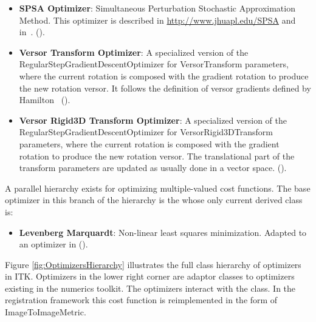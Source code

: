 \begin{itemize}
\item \textbf{SPSA Optimizer}: Simultaneous Perturbation Stochastic
Approximation Method. This optimizer is described in
\url{http://www.jhuapl.edu/SPSA} and in~\cite{Spall1998}.
(). 

\item \textbf{Versor Transform Optimizer}: A specialized version of the 
RegularStepGradientDescentOptimizer for VersorTransform
parameters, where the current rotation is composed with the gradient rotation
to produce the new rotation versor. It follows the definition of versor
gradients defined by Hamilton~\cite{Hamilton1866}
().

\item \textbf{Versor Rigid3D Transform Optimizer}: A specialized version of the
RegularStepGradientDescentOptimizer for VersorRigid3DTransform parameters,
where the current rotation is composed with the gradient rotation to produce
the new rotation versor. The translational part of the transform parameters are
updated as usually done in a vector space.
().


\end{itemize}

A parallel hierarchy exists for optimizing multiple-valued cost functions. The
base optimizer in this branch of the hierarchy is the
 whose only current derived class
is:

\begin{itemize}

\item \textbf{Levenberg Marquardt}: Non-linear least squares minimization.
Adapted to an optimizer in  ().

\end{itemize}


Figure \ref{fig:OptimizersHierarchy} illustrates the full class hierarchy of
optimizers in ITK. Optimizers in the lower right corner are adaptor classes
to optimizers existing in the  numerics toolkit. The optimizers
interact with the  class. In the registration framework
this cost function is reimplemented in the form of ImageToImageMetric.





